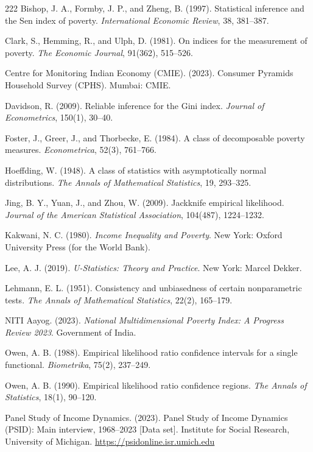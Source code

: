 \documentclass[11pt]{article}
\begin{document}
 \begin{thebibliography}{222}
 \bibitem{} Bishop, J. A., Formby, J. P., and Zheng, B. (1997). Statistical inference and the Sen index of poverty. \emph{International Economic Review}, 38, 381--387.

\bibitem{} Clark, S., Hemming, R., and Ulph, D. (1981). On indices for the measurement of poverty. \emph{The Economic Journal}, 91(362), 515--526.

\bibitem{} Centre for Monitoring Indian Economy (CMIE). (2023). Consumer Pyramids Household Survey (CPHS). Mumbai: CMIE.

 Davidson, R. (2009). Reliable inference for the Gini index. \emph{Journal of Econometrics}, 150(1), 30--40.

\bibitem{} Foster, J., Greer, J., and Thorbecke, E. (1984). A class of decomposable poverty measures. \emph{Econometrica}, 52(3), 761--766.

\bibitem{} Hoeffding, W. (1948). A class of statistics with asymptotically normal distributions. \emph{The Annals of Mathematical Statistics}, 19, 293--325.

 Jing, B. Y., Yuan, J., and Zhou, W. (2009). Jackknife empirical likelihood. \emph{Journal of the American Statistical Association}, 104(487), 1224--1232.

\bibitem{} Kakwani, N. C. (1980). \emph{Income Inequality and Poverty}. New York: Oxford University Press (for the World Bank).

 Lee, A. J. (2019). \emph{U-Statistics: Theory and Practice}. New York: Marcel Dekker.

 Lehmann, E. L. (1951). Consistency and unbiasedness of certain nonparametric tests. \emph{The Annals of Mathematical Statistics}, 22(2), 165--179.

\bibitem{} NITI Aayog. (2023). \emph{National Multidimensional Poverty Index: A Progress Review 2023}. Government of India.

 Owen, A. B. (1988). Empirical likelihood ratio confidence intervals for a single functional. \emph{Biometrika}, 75(2), 237--249.

 Owen, A. B. (1990). Empirical likelihood ratio confidence regions. \emph{The Annals of Statistics}, 18(1), 90--120.

\bibitem{} Panel Study of Income Dynamics. (2023). Panel Study of Income Dynamics (PSID): Main interview, 1968--2023 [Data set]. Institute for Social Research, University of Michigan. \url{https://psidonline.isr.umich.edu}


\end{thebibliography}
\end{document}

